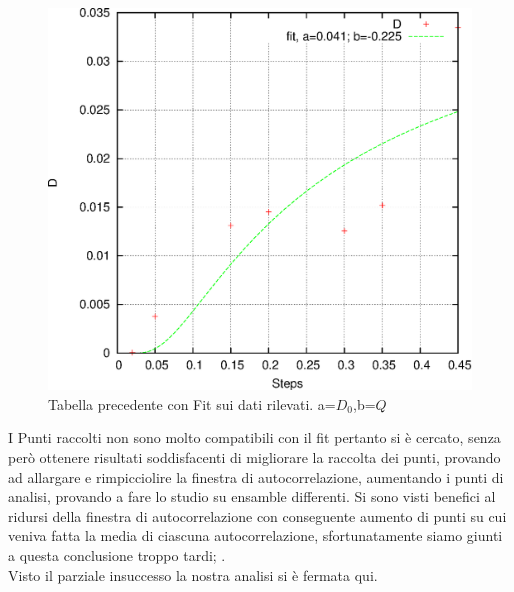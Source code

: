 \documentclass[a4paper,11pt]{article}
\begin{document}
			\begin{figure}[H]
				\centering
				\includegraphics[scale=0.7]{fit.eps}
				\caption{Tabella precedente con Fit sui dati rilevati. a=$D_0$,b=$Q$}
				\label{fig:figure1}
			\end{figure}
			
			I Punti raccolti non sono molto compatibili con il fit pertanto si è cercato, senza però ottenere risultati soddisfacenti di migliorare la raccolta dei punti, provando ad allargare e rimpicciolire la finestra di autocorrelazione, aumentando i punti di analisi, provando a fare lo studio su ensamble differenti. Si sono visti benefici al ridursi della finestra di autocorrelazione con conseguente aumento di punti su cui veniva fatta la media di ciascuna autocorrelazione, sfortunatamente siamo giunti a questa conclusione troppo tardi; .\\
			Visto il parziale insuccesso la nostra analisi si è fermata qui.
\end{document}
